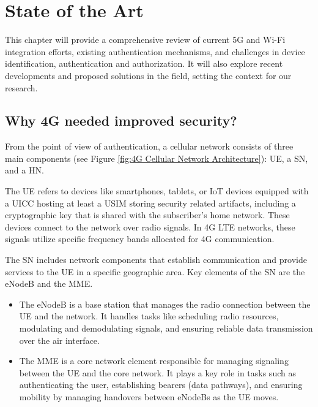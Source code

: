 \chapter{State of the Art}
\label{chapter:state-of-the-art}

\begin{introduction}
This chapter will provide a comprehensive review of current \ac{5G} and Wi-Fi integration efforts, existing authentication mechanisms, and challenges in device identification, authentication and authorization. It will also explore recent developments and proposed solutions in the field, setting the context for our research.
\end{introduction}

\section{Why \acs{4G} needed improved security?}

From the point of view of authentication, a cellular network consists of three main components (see Figure \ref{fig:4G Cellular Network Architecture}): \ac{UE}, a \ac{SN}, and a \ac{HN}.

The \ac{UE} refers to devices like smartphones, tablets, or IoT devices equipped with a \ac{UICC}  hosting at least a \ac{USIM} storing security related artifacts, including a cryptographic key that is shared with the subscriber’s home network. These devices connect to the network over radio signals. In \acf{4G} \ac{LTE} networks, these signals utilize specific frequency bands allocated for \ac{4G} communication.

The \ac{SN} includes network components that establish communication and provide services to the \ac{UE} in a specific geographic area. Key elements of the \ac{SN} are the \ac{eNodeB} and the \ac{MME}.

\begin{itemize}
    \item{
        The \ac{eNodeB} is a base station that manages the radio connection between the \ac{UE} and the network. It handles tasks like scheduling radio resources, modulating and demodulating signals, and ensuring reliable data transmission over the air interface.
    }
    \item {
        The \ac{MME} is a core network element responsible for managing signaling between the \ac{UE} and the core network. It plays a key role in tasks such as authenticating the user, establishing bearers (data pathways), and ensuring mobility by managing handovers between \acp{eNodeB} as the \ac{UE} moves.
    }
\end{itemize}

